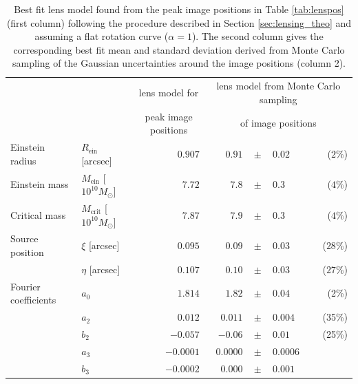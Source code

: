 
\begin{table}
\centering
\caption{Best fit lens model found from the peak image positions in Table \ref{tab:lenspos} (first column) following the procedure described in Section \ref{sec:lensing_theo} and assuming a flat rotation curve ($\alpha = 1$). The second column gives the corresponding best fit mean and standard deviation derived from Monte Carlo sampling of the Gaussian uncertainties around the image positions (column 2).}
\begin{tabular}{llrrclr}
\hline
 &  & \multicolumn{1}{c}{lens model for} &\multicolumn{4}{c}{lens model from Monte Carlo sampling  } \\
 &  & \multicolumn{1}{c}{peak image positions}  & \multicolumn{4}{c}{of image positions }  \\ \hline
Einstein radius      & $R_\text{ein}$ [arcsec]             & $0.907$ & $0.91$  & $\pm$ & $     0.02$ & ($2\%$)\\
Einstein mass        & $M_\text{ein}$ [$10^{10} M_\odot$]  & $7.72$  & $7.8 $  & $\pm$ & $      0.3$ & ($4\%$) \\
Critical mass        & $M_\text{crit}$ [$10^{10} M_\odot$] & $7.87$  & $7.9$   & $\pm$ & $      0.3$ & ($4\%$)\\
Source position      & $\xi$ [arcsec]                      & $0.095$ & $0.09 $ & $\pm$ & $     0.03$ & ($28\%$)\\
                     & $\eta$ [arcsec]                     & $0.107$ & $0.10 $ & $\pm$ & $     0.03$ & ($27\%$)\\
Fourier coefficients & $a_0$                               & $1.814$ & $1.82 $ & $\pm$ & $   0.04$ & (2\%)\\
                     & $a_2$                               & $0.012$ & $ 0.011 $ & $\pm$ & $    0.004$ & (35\%)\\
                     & $b_2$                               & $-0.057$ & $-0.06 $  & $\pm$ & $  0.01$ & (25\%)\\
                     & $a_3$                               & $-0.0001$& $0.0000 $ & $\pm$ & $   0.0006$ & \\
                     & $b_3$                               & $-0.0002$&$0.000 $   & $\pm$ & $  0.001$ & \\\hline
\end{tabular}  
\label{tab:bestfitlensmodel} 
\end{table}

